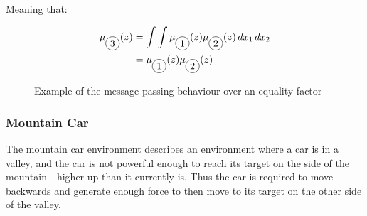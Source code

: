 \documentclass{article}
\newcommand*\circled[1]{\tikz[baseline=(char.base)]{
            \node[shape=circle,draw,inner sep=2pt] (char) {#1};}}
\begin{document}
Meaning that:

\begin{figure}[h]
    \centering
    \begin{minipage}{0.45\textwidth}
        \begin{equation*}
        \begin{aligned}
        	\mu_{\circled{3}}(z) &= \int \int \mu_{\circled{1}}(z) \mu_{\circled{2}}(z) \, dx_1 \, dx_2 \\
        	&= \mu_{\circled{1}}(z) \mu_{\circled{2}}(z)
        \end{aligned}
        \end{equation*}
    \end{minipage}
    \begin{minipage}{0.45\textwidth}
        \centering
        \label{fig:equality_factor}
    \end{minipage}
    \caption{Example of the message passing behaviour over an equality factor}
\end{figure}

\subsubsection{Mountain Car}

The mountain car environment describes an environment where a car is in a valley, and the car is not powerful enough to reach its target on the side of the mountain - higher up than it currently is. Thus the car is required to move backwards and generate enough force to then move to its target on the other side of the valley. 
\end{document}
